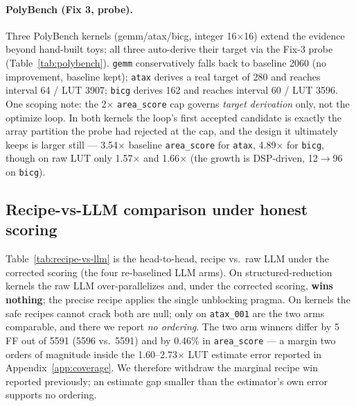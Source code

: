 \paragraph{PolyBench (Fix 3, probe).} Three PolyBench kernels (gemm/atax/bicg, integer
16$\times$16) extend the evidence beyond hand-built toys; all three auto-derive their
target via the Fix-3 probe (Table~\ref{tab:polybench}). \texttt{gemm} conservatively
falls back to baseline 2060 (no improvement, baseline kept); \texttt{atax} derives a
real target of 280 and reaches interval 64 / LUT 3907; \texttt{bicg} derives 162 and
reaches interval 60 / LUT 3596. One scoping note: the 2$\times$ \texttt{area\_score} cap
governs \emph{target derivation} only, not the optimize loop. In both kernels the loop's
first accepted candidate is exactly the array partition the probe had rejected at the
cap, and the design it ultimately keeps is larger still --- 3.54$\times$ baseline
\texttt{area\_score} for \texttt{atax}, 4.89$\times$ for \texttt{bicg}, though on raw LUT
only 1.57$\times$ and 1.66$\times$ (the growth is DSP-driven, 12$\rightarrow$96 on
\texttt{bicg}).

\begin{table}[h]
\centering\small
\caption{PolyBench recipe arm (16$\times$16 integer), targets auto-derived by the Fix-3 probe.}
\label{tab:polybench}
\end{table}

\subsection{Recipe-vs-LLM comparison under honest scoring}\label{app:scoring:comparison}

Table~\ref{tab:recipe-vs-llm} is the head-to-head, recipe vs.\ raw LLM under the
corrected scoring (the four re-baselined LLM arms). On structured-reduction kernels the
raw LLM over-parallelizes and, under the corrected scoring, \textbf{wins nothing}; the
precise recipe applies the single unblocking pragma. On kernels the safe recipes cannot
crack both are null; only on \texttt{atax\_001} are the two arms comparable, and
there we report \emph{no ordering}. The two arm winners differ by 5 FF out of 5591
(5596 vs.\ 5591) and by 0.46\% in \texttt{area\_score} --- a margin two orders of
magnitude inside the 1.60--2.73$\times$ LUT estimate error reported in
Appendix~\ref{app:coverage}. We therefore withdraw the marginal recipe win reported
previously; an estimate gap smaller than the estimator's own error supports no
ordering.

